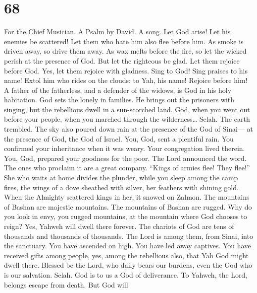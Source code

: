 \hypertarget{section-66}{%
\section{68}\label{section-66}}

For the Chief Musician. A Psalm by David. A song.  Let God
arise! Let his enemies be scattered! Let them who hate him also flee
before him.  As smoke is driven away, so drive them away. As
wax melts before the fire, so let the wicked perish at the presence of
God.  But let the righteous be glad. Let them rejoice before
God. Yes, let them rejoice with gladness.  Sing to God! Sing
praises to his name! Extol him who rides on the clouds: to Yah, his
name! Rejoice before him!  A father of the fatherless, and a
defender of the widows, is God in his holy habitation.  God
sets the lonely in families. He brings out the prisoners with singing,
but the rebellious dwell in a sun-scorched land.  God, when
you went out before your people, when you marched through the
wilderness\ldots{} Selah.  The earth trembled. The sky also
poured down rain at the presence of the God of Sinai--- at the presence
of God, the God of Israel.  You, God, sent a plentiful rain.
You confirmed your inheritance when it was weary.  Your
congregation lived therein. You, God, prepared your goodness for the
poor.  The Lord announced the word. The ones who proclaim
it are a great company.  ``Kings of armies flee! They
flee!'' She who waits at home divides the plunder,  while
you sleep among the camp fires, the wings of a dove sheathed with
silver, her feathers with shining gold.  When the Almighty
scattered kings in her, it snowed on Zalmon.  The mountains
of Bashan are majestic mountains. The mountains of Bashan are rugged.
 Why do you look in envy, you rugged mountains, at the
mountain where God chooses to reign? Yes, Yahweh will dwell there
forever.  The chariots of God are tens of thousands and
thousands of thousands. The Lord is among them, from Sinai, into the
sanctuary.  You have ascended on high. You have led away
captives. You have received gifts among people, yes, among the
rebellious also, that Yah God might dwell there.  Blessed
be the Lord, who daily bears our burdens, even the God who is our
salvation. Selah.  God is to us a God of deliverance. To
Yahweh, the Lord, belongs escape from death.  But God will
